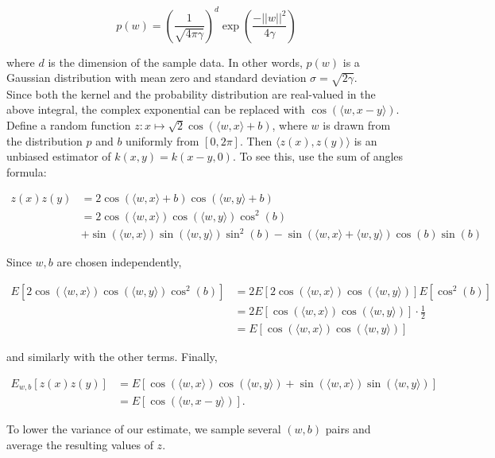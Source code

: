 \[ p(w) = \left(\dfrac{1}{\sqrt{4\pi\gamma}}\right)^d \exp\left(\frac{-||w||^2}{4\gamma}\right)\]

where $d$ is the dimension of the sample data. In other words, $p(w)$ is a Gaussian distribution with mean zero and standard deviation $\sigma = \sqrt{2\gamma}$.\\

 Since both the kernel and the probability distribution are real-valued in the above integral, the complex exponential can be replaced with $\cos(\langle w, x-y\rangle)$. Define a random function $z: x\mapsto \sqrt{2}\cos(\langle w,x\rangle + b)$, where $w$ is drawn from the distribution $p$ and $b$ uniformly from $[0,2\pi]$. Then $\langle z(x),z(y)\rangle$ is an unbiased estimator of $k(x,y)=k(x-y,0)$. To see this, use the sum of angles formula:

\begin{align*}
z(x)z(y) &= 2\cos(\langle w,x\rangle+b)\cos(\langle w,y\rangle+b)\\
			&= 2\cos(\langle w,x\rangle)\cos(\langle w,y\rangle)\cos^2(b) \\
				& +\sin(\langle w, x\rangle)\sin(\langle w, y\rangle)\sin^2(b) - \sin(\langle w, x\rangle+\langle w, y\rangle)\cos(b)\sin(b)
\end{align*}

Since $w,b$ are chosen independently,

\begin{align*}
E[2\cos(\langle w,x\rangle)\cos(\langle w,y\rangle)\cos^2(b)] &= 2E[2\cos(\langle w,x\rangle)\cos(\langle w,y\rangle)]E[\cos^2(b)]\\
	&= 2E[\cos(\langle w,x\rangle)\cos(\langle w,y\rangle)]\cdot \frac12 \\
	&= E[\cos(\langle w,x\rangle)\cos(\langle w,y\rangle)]
\end{align*}

and similarly with the other terms. Finally,

\begin{align*}
E_{w,b}[z(x)z(y)] &= E[\cos(\langle w,x\rangle)\cos(\langle w,y\rangle) + \sin(\langle w, x\rangle)\sin(\langle w, y\rangle)]\\
						&= E[\cos(\langle w, x-y\rangle)].
\end{align*}



To lower the variance of our estimate, we sample several $(w,b)$ pairs and average the resulting values of $z$.\\







